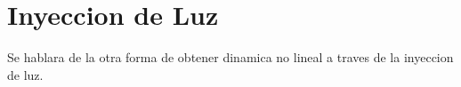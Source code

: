 
\section{Inyeccion de Luz}

	Se hablara de la otra forma de obtener dinamica no lineal a traves de la inyeccion de luz.
